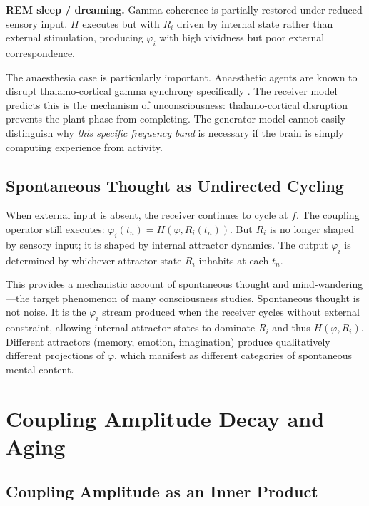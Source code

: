 \documentclass[12pt]{article}
\begin{document}
\textbf{REM sleep / dreaming.} Gamma coherence is partially restored under reduced sensory input. $H$ executes but with $R_i$ driven by internal state rather than external stimulation, producing $\varphi_i$ with high vividness but poor external correspondence.

The anaesthesia case is particularly important. Anaesthetic agents are known to disrupt thalamo-cortical gamma synchrony specifically \cite{alkire2008}. The receiver model predicts this is the mechanism of unconsciousness: thalamo-cortical disruption prevents the plant phase from completing. The generator model cannot easily distinguish why \textit{this specific frequency band} is necessary if the brain is simply computing experience from activity.

\subsection{Spontaneous Thought as Undirected Cycling}

When external input is absent, the receiver continues to cycle at $f$. The coupling operator still executes: $\varphi_i(t_n) = H(\varphi, R_i(t_n))$. But $R_i$ is no longer shaped by sensory input; it is shaped by internal attractor dynamics. The output $\varphi_i$ is determined by whichever attractor state $R_i$ inhabits at each $t_n$.

This provides a mechanistic account of spontaneous thought and mind-wandering---the target phenomenon of many consciousness studies. Spontaneous thought is not noise. It is the $\varphi_i$ stream produced when the receiver cycles without external constraint, allowing internal attractor states to dominate $R_i$ and thus $H(\varphi, R_i)$. Different attractors (memory, emotion, imagination) produce qualitatively different projections of $\varphi$, which manifest as different categories of spontaneous mental content.

\section{Coupling Amplitude Decay and Aging}

\subsection{Coupling Amplitude as an Inner Product}
\end{document}
